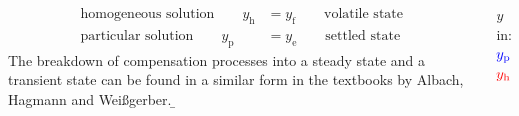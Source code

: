 \begin{frame}
\begin{columns}
{    \begin{align}
        \text{homogeneous solution}\qquad y_{\mathrm{h}} &= y_{\mathrm{f}} \qquad \text{volatile state}\\
        \text{particular solution}\qquad y_{\mathrm{p}} &= y_{\mathrm{e}} \qquad \text{settled state}
    \end{align}
    The breakdown of compensation processes into a steady state and a transient state
    can be found in a similar form in the textbooks by Albach\cite{albach}, Hagmann\cite{hagmann} and Weißgerber\cite{weissgerber3}.
}%
\b{%
     $y$ in:\\
     ${\color{blue}y_{\mathrm{p}}}$\\
     ${\color{red}y_{\mathrm{h}}}$

}
\end{columns}
\end{frame}
